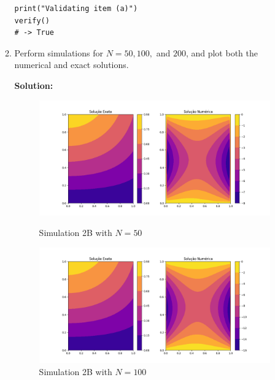 \documentclass[aps,amsmath,amssymb,floatfix]{revtex4}
\begin{document}
\begin{enumerate}
\begin{enumerate}
	      	      \begin{lstlisting}
print("Validating item (a)")
verify()
# -> True
	      	      \end{lstlisting}
	      	      
	      	\item Perform simulations for $N = 50, 100,$ and $200$, and plot both the numerical and exact solutions.
	      	      
	      	      \textbf{Solution:}
	      	      
	      	      \begin{figure}[H]
	      	      	\centering
	      	      	\begin{minipage}{0.32\textwidth}
	      	      		\centering
	      	      		\includegraphics[width=\textwidth]{img/Problem2/50.png}
	      	      		\caption{Simulation 2B with $N = 50$}
	      	      	\end{minipage}
	      	      	\hfill
	      	      	\begin{minipage}{0.32\textwidth}
	      	      		\centering
	      	      		\includegraphics[width=\textwidth]{img/Problem2/100.png}
	      	      		\caption{Simulation 2B with $N = 100$}
	      	      	\end{minipage}
	      	      	\hfill

\end{figure}
\end{enumerate}
\end{enumerate}
\end{document}

